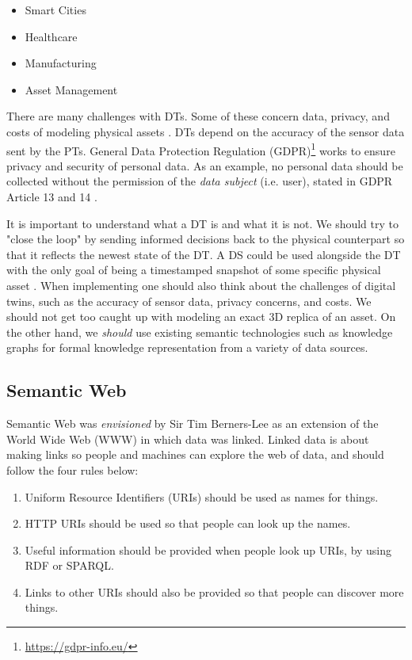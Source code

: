 \documentclass{article}
\begin{document}
\begin{itemize}
    \item Smart Cities
    \item Healthcare
    \item Manufacturing
    \item Asset Management
\end{itemize}


There are many challenges with DTs. Some of these concern data, privacy, and costs of modeling physical assets \cite{fuller_digital_2020, waszak_let_2022}. DTs depend on the accuracy of the sensor data sent by the PTs. General Data Protection Regulation (GDPR)\footnote{\url{https://gdpr-info.eu/}} works to ensure privacy and security of personal data. As an example, no personal data should be collected without the permission of the \emph{data subject} (i.e. user), stated in GDPR Article 13 and 14 \cite{noauthor_guide_nodate}.


It is important to understand what a DT is and what it is not. We should try to "close the loop" by sending informed decisions back to the physical counterpart so that it reflects the newest state of the DT. A DS could be used alongside the DT with the only goal of being a timestamped snapshot of some specific physical asset \cite{bergs_concept_2021}. When implementing one should also think about the challenges of digital twins, such as the accuracy of sensor data, privacy concerns, and costs. We should not get too caught up with modeling an exact 3D replica of an asset. On the other hand, we \emph{should} use existing semantic technologies such as knowledge graphs for formal knowledge representation from a variety of data sources.





\subsection{Semantic Web}
Semantic Web was \emph{envisioned} by Sir Tim Berners-Lee as an extension of the World Wide Web (WWW) in which data was linked. Linked data is about making links so people and machines can explore the web of data, and should follow the four rules \cite{tim_berners-lee_linked_nodate} below: 

\begin{enumerate}
    \item Uniform Resource Identifiers (URIs) should be used as names for things.
    \item HTTP URIs should be used so that people can look up the names.
    \item Useful information should be provided when people look up URIs, by using RDF or SPARQL.
    \item Links to other URIs should also be provided so that people can discover more things.
\end{enumerate}
\end{document}

